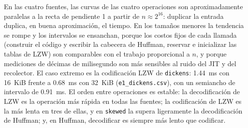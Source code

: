 
En las cuatro fuentes, las curvas de las cuatro operaciones son aproximadamente paralelas a la
recta de pendiente 1 a partir de $n \approx 2^{16}$: duplicar la entrada duplica, en buena
aproximación, el tiempo. En los tamaños menores la tendencia se rompe y los intervalos se
ensanchan, porque los costos fijos de cada llamada (construir el código y escribir la cabecera
de Huffman, reservar e inicializar las tablas de LZW) son comparables con el trabajo
proporcional a $n$, y porque mediciones de décimas de milisegundo son más sensibles al ruido
del JIT y del recolector. El caso extremo es la codificación LZW de \texttt{dickens}: 1.44~ms
con 16~KiB frente a 0.68~ms con 32~KiB (\texttt{e1\_dickens.csv}), con un semiancho de
intervalo de 0.91~ms. El orden entre operaciones es estable: la decodificación de LZW es la
operación más rápida en todas las fuentes; la codificación de LZW es la más lenta en tres de
ellas, y en \texttt{skewed} la supera ligeramente la decodificación de Huffman; y, en Huffman,
decodificar es siempre más lento que codificar.


